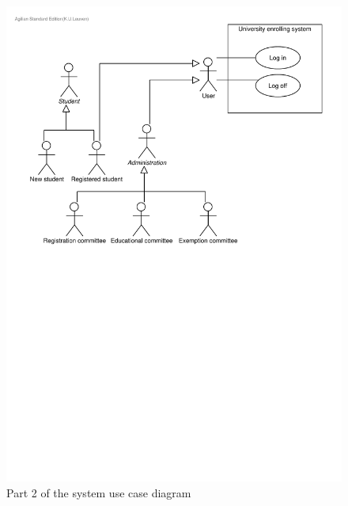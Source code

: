 \begin{figure}[H]
	\begin{centering}
		\includegraphics[width=\textwidth]{figs/system-use-case-diagram2.pdf}
		\caption{Part 2 of the system use case diagram}
		\label{fig:system-use-case-diagram2}
	\end{centering}
\end{figure}











